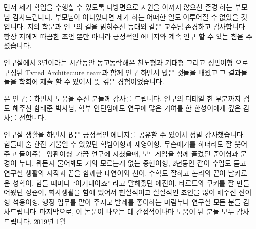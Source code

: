먼저 제가 학업을 수행할 수 있도록 다방면으로 지원을 아끼지 않으신 존경 하는 부모님 감사드립니다.
부모님이 아니었다면 제가 하는 어떠한 일도 이루어질 수 없었을 것 입니다.
저의 학문과 연구의 길을 밝혀주신 등대와 같은 교수님 존경하고 감사합니다.
항상 저에게 따끔한 조언 뿐만 아니라 긍정적인 에너지와 계속 연구 할 수 있는 힘을 주셨습니다.

연구실에서 3년이라는 시간동안 동고동락해온 찬노형과 기태형 그리고 성민이형 으로 구성된 
Typed Architecture team과 함께 연구 하면서 많은 것들을 배웠고 
그 결과물들을 학회에 제출 할 수 있어서 뜻 깊은 경험이었습니다.

본 연구를 하면서 도움을 주신 분들께 감사를 드립니다.
연구의 디테일 한 부분까지 검토 해주신 함태준 박사님,
학부 인턴임에도 연구에 많은 기여를 한 한성이에게 깊은 감사를 전합니다.

연구실 생활을 하면서 많은 긍정적인 에너지를 공유할 수 있어서 정말 감사했습니다.
힘들때 술 한잔 기울일 수 있었던 학범이형과 재영이형, 무슨얘기를 하더라도 잘 웃어주고 들어주는 영환이형,
가끔 연구에 지쳤을때, 보드게임을 함께 즐겼던 준이형과 문경이 누나,
뭐든지 물어봐도 거의 모르는게 없는 종현이형,
2년동안 같이 수업도 듣고 연구실 생활의 시작과 끝을 함께한 대연이와 천이,
수학도 잘하고 논리의 끝이 날카로운 성학이,
힘들 때마다 “이겨내야죠” 라고 말해줬던 예진이, 타르트와 쿠키를 잘 만들어왔던 성준이,
회사생활을 함에 있어서 현실적이고 실질적인 조언을 많이 해주신 신이형 석용이형,
행정 업무를 맡아 주시고 발레를 좋아하는 미림누나
연구실 모든 분들 감사드립니다.
마지막으로, 이 논문이 나오는 데 간접적이나마 도움이 된 분들 모두 감사드립니다.
2019년 1월
